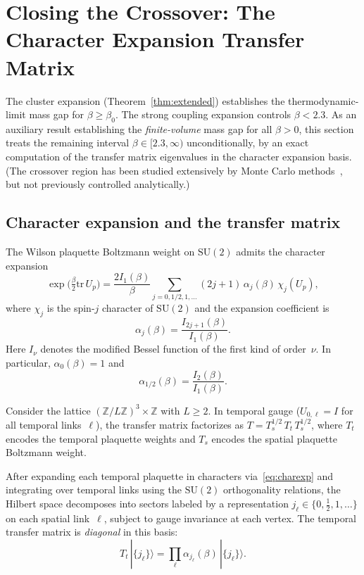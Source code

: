\documentclass[11pt]{article}
\theoremstyle{definition}
\newcommand{\SU}{\mathrm{SU}}
\newcommand{\tr}{\mathrm{tr}}
\newcommand{\Z}{\mathbb{Z}}
\begin{document}
\section{Closing the Crossover: The Character Expansion
Transfer Matrix}\label{sec:crossover}

The cluster expansion
(Theorem~\ref{thm:extended}) establishes the thermodynamic-limit mass
gap for $\beta\ge\beta_0$.  The strong coupling expansion controls
$\beta<2.3$.  As an auxiliary result establishing the
\emph{finite-volume} mass gap for all $\beta>0$, this section treats
the remaining interval $\beta\in[2.3,\infty)$
unconditionally, by an exact computation of the transfer matrix
eigenvalues in the character expansion basis.  (The crossover region
has been studied extensively by Monte Carlo methods~\cite{Creutz80},
but not previously controlled analytically.)

\subsection{Character expansion and the transfer matrix}

The Wilson plaquette Boltzmann weight on $\SU(2)$ admits the character
expansion
\begin{equation}\label{eq:charexp}
\exp\bigl(\tfrac{\beta}{2}\tr\,U_p\bigr)
=\frac{2I_1(\beta)}{\beta}\sum_{j=0,1/2,1,\ldots}(2j+1)\,\alpha_j(\beta)\,\chi_j(U_p),
\end{equation}
where $\chi_j$ is the spin-$j$ character of $\SU(2)$ and the expansion
coefficient is
\begin{equation}\label{eq:alpha}
\alpha_j(\beta)=\frac{I_{2j+1}(\beta)}{I_1(\beta)}.
\end{equation}
Here $I_\nu$ denotes the modified Bessel function of the first kind
of order~$\nu$.  In particular, $\alpha_0(\beta)=1$ and
\begin{equation}
\alpha_{1/2}(\beta)=\frac{I_2(\beta)}{I_1(\beta)}.
\end{equation}

Consider the lattice $(\Z/L\Z)^3\times\Z$ with $L\ge 2$.  In
temporal gauge ($U_{0,\ell}=I$ for all temporal links~$\ell$), the
transfer matrix factorizes as $T=T_s^{1/2}\,T_t\,T_s^{1/2}$, where
$T_t$ encodes the temporal plaquette weights and $T_s$ encodes the
spatial plaquette Boltzmann weight.

After expanding each temporal plaquette in characters
via~\eqref{eq:charexp} and integrating over temporal links using the
$\SU(2)$ orthogonality relations, the Hilbert space decomposes into
sectors labeled by a representation $j_\ell\in\{0,\frac{1}{2},1,\ldots\}$
on each spatial link~$\ell$, subject to gauge invariance at each
vertex.  The temporal transfer matrix is \emph{diagonal} in this basis:
\begin{equation}\label{eq:Tt}
T_t\,|\{j_\ell\}\rangle
=\prod_\ell\alpha_{j_\ell}(\beta)\,|\{j_\ell\}\rangle.
\end{equation}
\end{document}
